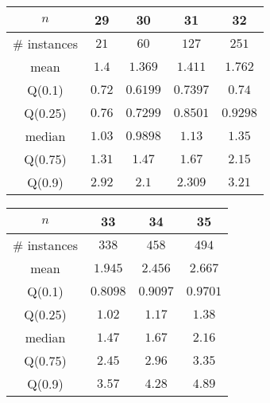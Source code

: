 \begin{tabular}{c|cccc} 
\hline 
$n$ & 29 & 30 & 31 & 32 \tabularnewline 
\hline 
\hline 
\# instances & $21$ & $60$ & $127$ & $251$ \tabularnewline 
mean & $1.4$ & $1.369$ & $1.411$ & $1.762$ \tabularnewline 
Q(0.1) & $0.72$ & $0.6199$ & $0.7397$ & $0.74$ \tabularnewline 
Q(0.25) & $0.76$ & $0.7299$ & $0.8501$ & $0.9298$ \tabularnewline 
median & $1.03$ & $0.9898$ & $1.13$ & $1.35$ \tabularnewline 
Q(0.75) & $1.31$ & $1.47$ & $1.67$ & $2.15$ \tabularnewline 
Q(0.9) & $2.92$ & $2.1$ & $2.309$ & $3.21$ \tabularnewline 
\hline 
\end{tabular} 
\medskip{} 

\begin{tabular}{c|ccc} 
\hline 
$n$ & 33 & 34 & 35 \tabularnewline 
\hline 
\hline 
\# instances & $338$ & $458$ & $494$ \tabularnewline 
mean & $1.945$ & $2.456$ & $2.667$ \tabularnewline 
Q(0.1) & $0.8098$ & $0.9097$ & $0.9701$ \tabularnewline 
Q(0.25) & $1.02$ & $1.17$ & $1.38$ \tabularnewline 
median & $1.47$ & $1.67$ & $2.16$ \tabularnewline 
Q(0.75) & $2.45$ & $2.96$ & $3.35$ \tabularnewline 
Q(0.9) & $3.57$ & $4.28$ & $4.89$ \tabularnewline 
\hline 
\end{tabular} 
\medskip{} 

